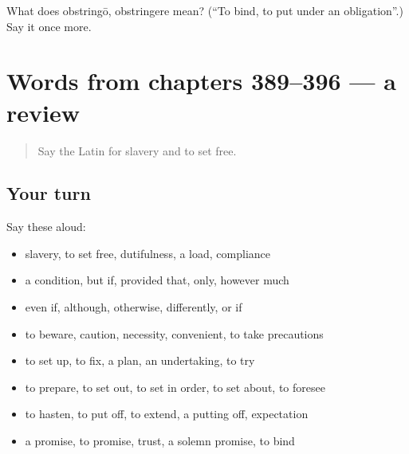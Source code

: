 \begin{tcolorbox}[breakable,colback=teal!4,colframe=teal!35!black,title={Before you move on}]
What does obstringō, obstringere mean? (\textquotedblleft{}To bind, to put under an obligation\textquotedblright{}.) Say it once more.
\end{tcolorbox}
\section[(dialogue)]{Words from chapters 389–396 — a review}

\label{lesson:LA-R396-review-389-396}



\begin{quote}
Say the Latin for slavery and to set free.
\end{quote}

\subsection*{Your turn}
Say these aloud:

\begin{itemize}
\raggedright
  \item slavery, to set free, dutifulness, a load, compliance
  \item a condition, but if, provided that, only, however much
  \item even if, although, otherwise, differently, or if
  \item to beware, caution, necessity, convenient, to take precautions
  \item to set up, to fix, a plan, an undertaking, to try
  \item to prepare, to set out, to set in order, to set about, to foresee
  \item to hasten, to put off, to extend, a putting off, expectation
  \item a promise, to promise, trust, a solemn promise, to bind
\end{itemize}

